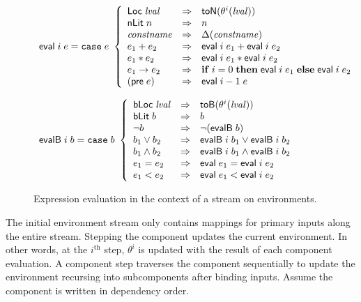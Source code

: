 \begin{figure*}
\[
\begin{array}{l}
\mathsf{eval}\; i\; e =
\mathtt{case}\; e\
 \left\{
 \begin{array}{lcl}
    \mathsf{Loc}\; \mathit{lval} & \Rightarrow & \mathsf{toN}(\theta^i(\mathit{lval})) \\
    \mathsf{nLit}\; n & \Rightarrow & n  \\
    \mathit{constname} & \Rightarrow & \Delta(\mathit{constname})  \\
    e_1 + e_2 & \Rightarrow & \mathsf{eval}\; i \; e_1 + \mathsf{eval}\; i \; e_2  \\
    e_1 * e_2 & \Rightarrow & \mathsf{eval}\; i \; e_1 * \mathsf{eval}\; i \; e_2  \\
    e_1 \rightarrow e_2 & \Rightarrow &  \mathbf{if}\; i = 0\; \mathbf{then}\; \mathsf{eval}\; i \; e_1\; 
                                         \mathbf{else}\; \mathsf{eval}\; i \; e_2 \\
    (\mathsf{pre}\; e) & \Rightarrow &  \mathsf{eval}\; i-1 \; e
  \end{array}
 \right.
 \\ \\
\mathsf{evalB}\; i \; b =
\mathtt{case}\; b\
 \left\{
 \begin{array}{lcl}
    \mathsf{bLoc}\; \mathit{lval} & \Rightarrow & \mathsf{toB}(\theta^i(\mathit{lval})) \\
    \mathsf{bLit}\; b & \Rightarrow & b \\
    \neg b & \Rightarrow & \neg(\mathsf{evalB} \; b)  \\
    b_1 \lor b_2 & \Rightarrow & \mathsf{evalB}\; i \;b_1 \lor \mathsf{evalB}\; i \;b_2   \\
    b_1 \land b_2 & \Rightarrow & \mathsf{evalB}\; i \;b_1 \land \mathsf{evalB}\; i \;b_2   \\
    e_1 = e_2 & \Rightarrow & \mathsf{eval} \;e_1 = \mathsf{eval}\; i \;e_2   \\
    e_1 < e_2 & \Rightarrow & \mathsf{eval} \;e_1 < \mathsf{eval}\; i \;e_2
  \end{array}
 \right.
\end{array}
\]
\caption{Expression evaluation in the context of a stream on environments.}
\label{fig:eval}
\end{figure*}

The initial environment stream only contains mappings for primary inputs along the entire stream. Stepping the component updates the current environment. In other words, at the $i^\mathrm{th}$ step, $\theta^i$ is updated with the result of each component evaluation. A component step traverses the component sequentially to update the environment recursing into subcomponents after binding inputs. Assume the component is written in dependency order. 

